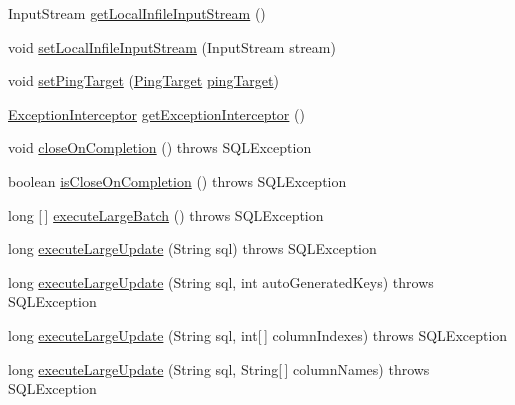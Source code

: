 \begin{DoxyCompactItemize}
\item 
Input\+Stream \mbox{\hyperlink{classcom_1_1mysql_1_1cj_1_1jdbc_1_1_statement_impl_a52f35ba4029870388a69d493851e726a}{get\+Local\+Infile\+Input\+Stream}} ()
\item 
void \mbox{\hyperlink{classcom_1_1mysql_1_1cj_1_1jdbc_1_1_statement_impl_a398ed93fc7171fac680cd867a87cbf23}{set\+Local\+Infile\+Input\+Stream}} (Input\+Stream stream)
\item 
void \mbox{\hyperlink{classcom_1_1mysql_1_1cj_1_1jdbc_1_1_statement_impl_abf41b78c8e7c3e4f62f7bedb8bf1a4b0}{set\+Ping\+Target}} (\mbox{\hyperlink{interfacecom_1_1mysql_1_1cj_1_1_ping_target}{Ping\+Target}} \mbox{\hyperlink{classcom_1_1mysql_1_1cj_1_1jdbc_1_1_statement_impl_a6e08338f8dca3b16c9da609a571fcf29}{ping\+Target}})
\item 
\mbox{\hyperlink{interfacecom_1_1mysql_1_1cj_1_1exceptions_1_1_exception_interceptor}{Exception\+Interceptor}} \mbox{\hyperlink{classcom_1_1mysql_1_1cj_1_1jdbc_1_1_statement_impl_a8c7aeabcfab5a1dcac5bf2fec0accaab}{get\+Exception\+Interceptor}} ()
\item 
void \mbox{\hyperlink{classcom_1_1mysql_1_1cj_1_1jdbc_1_1_statement_impl_acd9358a76e0fe9e8aa7f5cfb4ee6a5af}{close\+On\+Completion}} ()  throws S\+Q\+L\+Exception 
\item 
boolean \mbox{\hyperlink{classcom_1_1mysql_1_1cj_1_1jdbc_1_1_statement_impl_a098584b310115f209ef1c28829438e28}{is\+Close\+On\+Completion}} ()  throws S\+Q\+L\+Exception 
\item 
long \mbox{[}$\,$\mbox{]} \mbox{\hyperlink{classcom_1_1mysql_1_1cj_1_1jdbc_1_1_statement_impl_ad5138e585c47eef34667efe73d0a954f}{execute\+Large\+Batch}} ()  throws S\+Q\+L\+Exception 
\item 
long \mbox{\hyperlink{classcom_1_1mysql_1_1cj_1_1jdbc_1_1_statement_impl_a33be0126be83d0094c9d363132497a4e}{execute\+Large\+Update}} (String sql)  throws S\+Q\+L\+Exception 
\item 
long \mbox{\hyperlink{classcom_1_1mysql_1_1cj_1_1jdbc_1_1_statement_impl_acb364f005fd4a5b579ebecbc3303fca9}{execute\+Large\+Update}} (String sql, int auto\+Generated\+Keys)  throws S\+Q\+L\+Exception 
\item 
long \mbox{\hyperlink{classcom_1_1mysql_1_1cj_1_1jdbc_1_1_statement_impl_a80eeb600ed30f4f2dc7ea99891e594b1}{execute\+Large\+Update}} (String sql, int\mbox{[}$\,$\mbox{]} column\+Indexes)  throws S\+Q\+L\+Exception 
\item 
long \mbox{\hyperlink{classcom_1_1mysql_1_1cj_1_1jdbc_1_1_statement_impl_ac8be77a2303189e5efa1c5c9d34d0962}{execute\+Large\+Update}} (String sql, String\mbox{[}$\,$\mbox{]} column\+Names)  throws S\+Q\+L\+Exception 

\end{DoxyCompactItemize}
